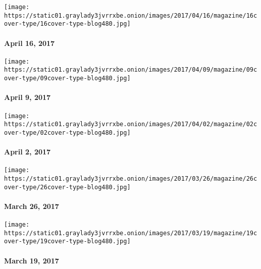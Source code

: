 \texttt{[image: https://static01.graylady3jvrrxbe.onion/images/2017/04/16/magazine/16cover-type/16cover-type-blog480.jpg]}

\hypertarget{april-16-2017}{%
\paragraph{April 16, 2017}\label{april-16-2017}}

\href{https://www.nytimes3xbfgragh.onion/issue/magazine/2017/04/07/magazine-index-20170409}{}

\texttt{[image: https://static01.graylady3jvrrxbe.onion/images/2017/04/09/magazine/09cover-type/09cover-type-blog480.jpg]}

\hypertarget{april-9-2017}{%
\paragraph{April 9, 2017}\label{april-9-2017}}

\href{https://www.nytimes3xbfgragh.onion/issue/magazine/2017/03/31/magazine-index-20170402}{}

\texttt{[image: https://static01.graylady3jvrrxbe.onion/images/2017/04/02/magazine/02cover-type/02cover-type-blog480.jpg]}

\hypertarget{april-2-2017}{%
\paragraph{April 2, 2017}\label{april-2-2017}}

\href{https://www.nytimes3xbfgragh.onion/issue/magazine/2017/03/24/magazine-index-20170326}{}

\texttt{[image: https://static01.graylady3jvrrxbe.onion/images/2017/03/26/magazine/26cover-type/26cover-type-blog480.jpg]}

\hypertarget{march-26-2017}{%
\paragraph{March 26, 2017}\label{march-26-2017}}

\href{https://www.nytimes3xbfgragh.onion/issue/magazine/2017/03/17/31917-20170319}{}

\texttt{[image: https://static01.graylady3jvrrxbe.onion/images/2017/03/19/magazine/19cover-type/19cover-type-blog480.jpg]}

\hypertarget{march-19-2017}{%
\paragraph{March 19, 2017}\label{march-19-2017}}

